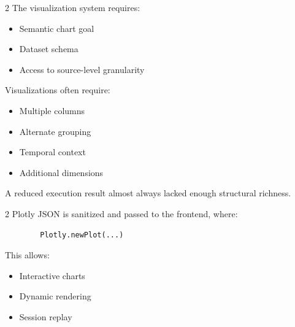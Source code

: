 \documentclass[12pt, oneside]{report}
\begin{document}

\begin{multicols}{2}
    The visualization system requires:

    \begin{itemize}
    \item Semantic chart goal
    \item Dataset schema
    \item Access to source-level granularity
    \end{itemize}

    \vspace*{\fill}\columnbreak

    Visualizations often require:

    \begin{itemize}
        \item Multiple columns
        \item Alternate grouping
        \item Temporal context
        \item Additional dimensions
    \end{itemize}
    \vspace*{\fill}
\end{multicols}

A reduced execution result almost always lacked enough structural richness.


\begin{multicols}{2}
    Plotly JSON is sanitized and passed to the frontend, where:

    \begin{verbatim}
        Plotly.newPlot(...)
    \end{verbatim}

    \vspace*{\fill}\columnbreak

    This allows:

    \begin{itemize}
        \item Interactive charts
        \item Dynamic rendering
        \item Session replay
    \end{itemize}
\end{multicols}


\end{document}

